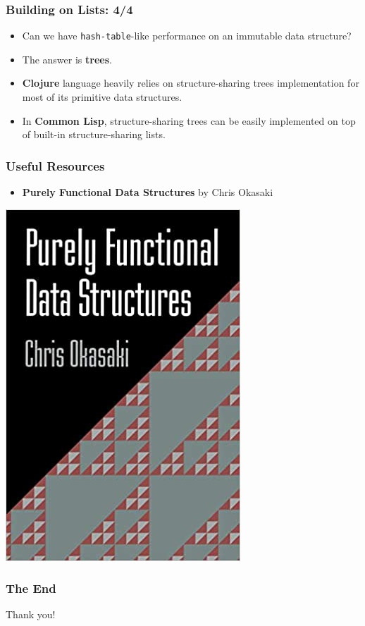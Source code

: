 \documentclass{beamer}
\begin{document}
\begin{frame}[fragile]
  \frametitle{Building on Lists: 4/4}
  \begin{itemize}
  \item Can we have \texttt{hash-table}-like performance on an
    immutable data structure?
  \item The answer is \textbf{trees}.
  \item \textbf{Clojure} language heavily relies on structure-sharing trees
    implementation for most of its primitive data structures.
  \item In \textbf{Common Lisp}, structure-sharing trees can be easily
    implemented on top of built-in structure-sharing lists.
  \end{itemize}
\end{frame}

\begin{frame}[fragile]
  \frametitle{Useful Resources}
  \begin{minipage}{0.6\textwidth}\raggedright
    \begin{itemize}
    \item \textbf{Purely Functional Data Structures} by Chris Okasaki
    \end{itemize}
  \end{minipage}
  \begin{minipage}{0.3\textwidth}
    \includegraphics[width=\linewidth]{pfds}
  \end{minipage}
\end{frame}

\begin{frame}
  \frametitle{The End}
  \begin{center}
    Thank you!
  \end{center}
\end{frame}
\end{document}
